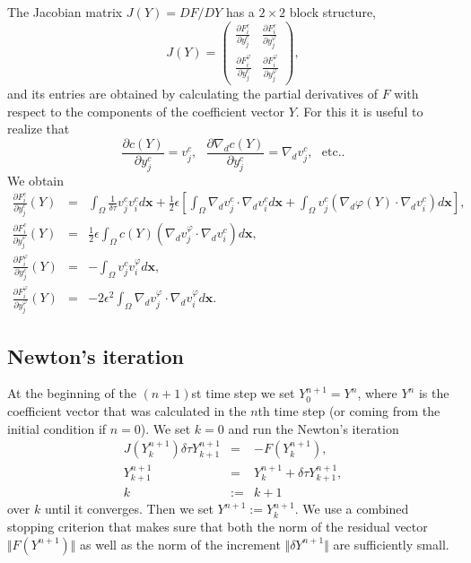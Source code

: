 \noindent
The Jacobian matrix $J(Y) = DF/DY$ has a $2\times 2$ block structure,
\begin{equation}
J(Y) = \left(
\begin{array}{cc}
  \displaystyle \frac{\partial F_i^c}{\partial y_j^c} & \displaystyle \frac{\partial F_i^c}{\partial y_j^{\varphi}} \\ 
  \displaystyle \frac{\partial F_i^{\varphi}}{\partial y_j^c} & \displaystyle \frac{\partial F_i^{\varphi}}{\partial y_j^{\varphi}}
\end{array}
\right),
\end{equation}
and its entries are obtained by calculating the partial derivatives of $F$ with
respect to the components of the coefficient vector $Y$. For this it is useful to 
realize that 
$$
\frac{\partial c(Y)}{\partial y_j^c} = v_j^c, \ \ \ 
\frac{\partial \nabla_d c(Y)}{\partial y_j^c} = \nabla_d v_j^c,\ \ \ \mbox{etc.}.
$$
We obtain
\begin{eqnarray}
  \frac{\partial F_i^c}{\partial y_j^c}(Y) &=& 
  \int_{\Omega} \frac{1}{\delta\tau} v_j^c v_i^c d\mathbf{x} + 
  \frac 12 \epsilon\left[\int_{\Omega} \nabla_d v_j^c \cdot \nabla_d v_i^c d\mathbf{x}
  + \int_{\Omega} v_j^c \left(\nabla_d \varphi(Y) \cdot \nabla_d v_i^c\right) d\mathbf{x}\right],\label{eq:dFcdyc}\\
  \frac{\partial F_i^c}{\partial y_j^{\varphi}}(Y) &=&
  \frac 12 \epsilon \int_{\Omega} c(Y) \left(\nabla_d v_j^{\varphi} \cdot \nabla_d v_i^c\right) d\mathbf{x},\\
  \frac{\partial F_i^{\varphi}}{\partial y_j^c}(Y) &=&
  - \int_{\Omega} v_j^c v_i^{\varphi} d\mathbf{x},\\
  \frac{\partial F_i^{\varphi}}{\partial y_j^{\varphi}}(Y) &=&
  -2\epsilon^2\int_{\Omega} \nabla_d v_j^{\varphi} \cdot \nabla_d v_i^{\varphi} d\mathbf{x}\label{eq:dFphidyphi}.
\end{eqnarray}

\subsection{Newton's iteration}
At the beginning of the $(n+1)$st time step we 
set $Y^{n+1}_0 = Y^n$, where $Y^n$ is the coefficient vector  
that was calculated in the $n$th time step (or coming from the 
initial condition if $n = 0$). We set $k = 0$ and run the 
Newton's iteration 
\begin{eqnarray*}
J(Y^{n+1}_k) \delta\tau Y^{n+1}_{k+1} &=& -F(Y^{n+1}_k), \\ 
Y^{n+1}_{k+1} &=& Y^{n+1}_k + \delta\tau Y^{n+1}_{k+1}, \\
k &:=& k+1
\end{eqnarray*}
over $k$ until it converges. Then we set $Y^{n+1} := Y^{n+1}_{k}$. 
We use a combined stopping criterion 
that makes sure that both the norm of the residual vector $\Vert F(Y^{n+1})\Vert$ 
as well as the norm of the increment $\Vert \delta Y^{n+1}\Vert$ are sufficiently 
small.

